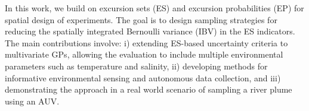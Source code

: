 \documentclass[aoas]{imsart}
\begin{document}






In this work, we build on excursion sets (ES) and excursion
probabilities (EP) for spatial design of experiments. The goal is to
design sampling strategies for reducing the spatially integrated
Bernoulli variance (IBV) in the ES indicators.  The main contributions
involve: i) extending ES-based uncertainty criteria to multivariate
GPs, allowing the evaluation to include multiple environmental
parameters such as temperature and salinity, ii) developing methods
for informative environmental sensing and autonomous data collection,
and iii) demonstrating the approach in a real world scenario of
sampling a river plume using an AUV.
\end{document}
